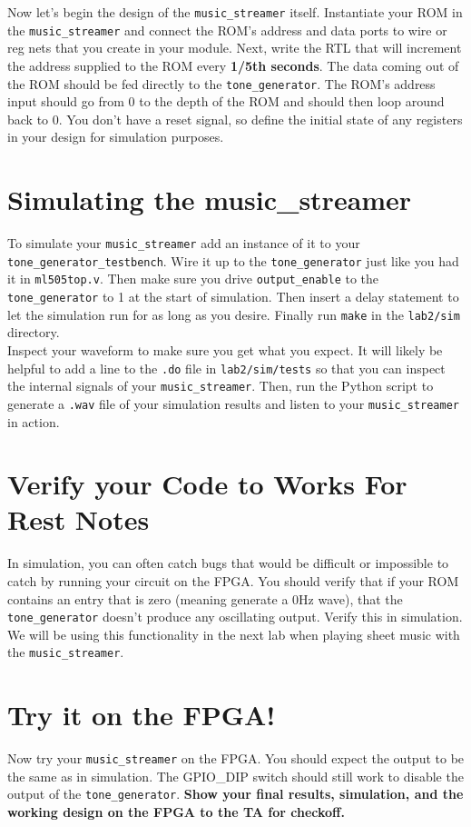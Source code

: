 \documentclass[11pt]{article}
\begin{document}
Now let's begin the design of the \verb|music_streamer| itself. Instantiate your ROM in the \verb|music_streamer| and connect the ROM's address and data ports to wire or reg nets that you create in your module. Next, write the RTL that will increment the address supplied to the ROM every \textbf{1/5th seconds}. The data coming out of the ROM should be fed directly to the \verb|tone_generator|. The ROM's address input should go from 0 to the depth of the ROM and should then loop around back to 0. You don't have a reset signal, so define the initial state of any registers in your design for simulation purposes.

\section{Simulating the music\_streamer}
To simulate your \verb|music_streamer| add an instance of it to your \verb|tone_generator_testbench|. Wire it up to the \verb|tone_generator| just like you had it in \verb|ml505top.v|. Then make sure you drive \verb|output_enable| to the \verb|tone_generator| to 1 at the start of simulation. Then insert a delay statement to let the simulation run for as long as you desire. Finally run \verb|make| in the \verb|lab2/sim| directory.\\

Inspect your waveform to make sure you get what you expect. It will likely be helpful to add a line to the \verb|.do| file in \verb|lab2/sim/tests| so that you can inspect the internal signals of your \verb|music_streamer|. Then, run the Python script to generate a \verb|.wav| file of your simulation results and listen to your \verb|music_streamer| in action.

\section{Verify your Code to Works For Rest Notes}
In simulation, you can often catch bugs that would be difficult or impossible to catch by running your circuit on the FPGA. You should verify that if your ROM contains an entry that is zero (meaning generate a 0Hz wave), that the \verb|tone_generator| doesn't produce any oscillating output. Verify this in simulation. We will be using this functionality in the next lab when playing sheet music with the \verb|music_streamer|.

\section{Try it on the FPGA!}
Now try your \verb|music_streamer| on the FPGA. You should expect the output to be the same as in simulation. The GPIO\_DIP switch should still work to disable the output of the \verb|tone_generator|. \textbf{Show your final results, simulation, and the working design on the FPGA to the TA for checkoff.}
\end{document}
